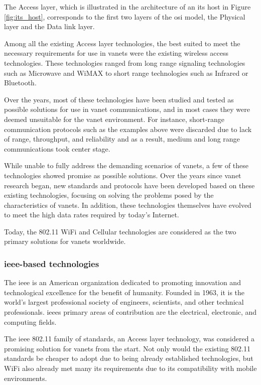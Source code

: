 The Access layer, which is illustrated in the architecture of an \gls{its} host in Figure \ref{fig:its_host}, corresponds to the first two layers of the \gls{osi} model, the Physical layer and the Data link layer\cite{etsi_intelligent_2020}.

Among all the existing Access layer technologies, the best suited to meet the necessary requirements for use in \glspl{vanet} were the existing wireless access technologies\cite{al-sultan_comprehensive_2014}. These technologies ranged from long range signaling technologies such as Microwave and WiMAX to short range technologies such as Infrared or Bluetooth\cite{anwer_survey_2014}.

Over the years, most of these technologies have been studied and tested as possible solutions for use in \gls{vanet} communications, and in most cases they were deemed unsuitable for the \gls{vanet} environment. For instance, short-range communication protocols such as the examples above were discarded due to lack of range, throughput, and reliability and as a result, medium and long range communications took center stage.

While unable to fully address the demanding scenarios of \glspl{vanet}, a few of these technologies showed promise as possible solutions. Over the years since \gls{vanet} research began, new standards and protocols have been developed based on these existing technologies, focusing on solving the problems posed by the characteristics of \glspl{vanet}. In addition, these technologies themselves have evolved to meet the high data rates required by today's Internet.

Today, the  802.11 WiFi and Cellular technologies are considered as the two primary solutions for \glspl{vanet} worldwide.

\subsubsection[IEEE-based technologies]{\gls{ieee}-based technologies}
The \gls{ieee} is an American organization dedicated to promoting innovation and technological excellence for the benefit of humanity. Founded in 1963, it is the world's largest professional society of engineers, scientists, and other technical professionals. \glspl{ieee} primary areas of contribution are the electrical, electronic, and computing fields\cite{noauthor_history_nodate}.

The \gls{ieee} 802.11 family of standards, an Access layer technology, was considered a promising solution for \glspl{vanet} from the start. Not only would the existing 802.11 standards be cheaper to adopt due to being already established technologies, but WiFi also already met many \gls{its} requirements due to its compatibility with mobile environments\cite{rohde__schwarz_intelligent_2019}.

